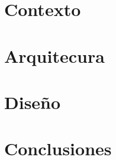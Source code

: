 \documentclass[11pt,fleqn]{book} %
\begin{document}
	\pagestyle{empty} %
	
	\tableofcontents %
	
	\cleardoublepage %
	
	\pagestyle{fancy} %
	
	
	\part{Contexto}
		
	
	
	
	\part{Arquitecura}
	
	
	
	
	
	
	
	
	\part{Diseño}
%	
%	
%	
%	
%	
%	
%	
%	
	
	
	\part{Conclusiones}
	
%	
%	
	
\backmatter



%
\end{document}
